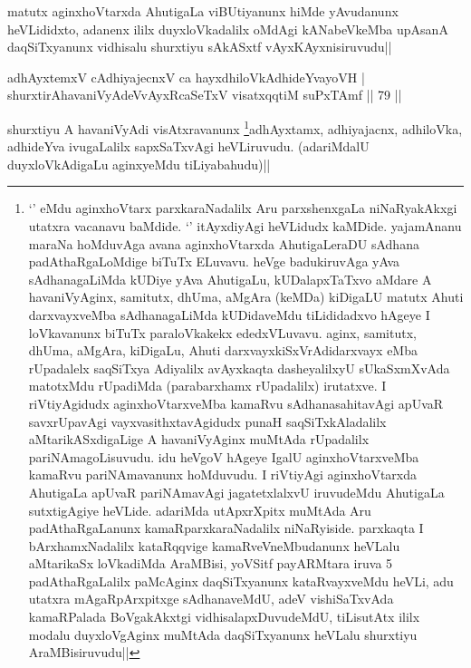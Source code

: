 \begin{artha}
matutx aginxhoVtarxda AhutigaLa viBUtiyanunx hiMde yAvudanunx 
heVLididxto, adanenx ililx duyxloVkadalilx oMdAgi kANabeVkeMba upAsanA 
daqSiTxyanunx vidhisalu shurxtiyu sAkASxtf vAyxKAyxnisiruvudu||
\end{artha}

\begin{shl}
adhAyxtemxV cAdhiyajecnxV ca hayxdhiloVkAdhideYvayoVH | \\
shurxtirAhavaniVyAdeVvAyxRcaSeTxV visatxqqtiM suPxTAmf \hfill|| 79 || 
\end{shl}

\begin{artha}
shurxtiyu A havaniVyAdi visAtxravanunx \footnote[1]{`\stext' eMdu 
aginxhoVtarx parxkaraNadalilx Aru parxshenxgaLa niNaRyakAkxgi utatxra 
vacanavu baMdide. `\stext' itAyxdiyAgi heVLidudx kaMDide. yajamAnanu 
maraNa hoMduvAga avana aginxhoVtarxda AhutigaLeraDU sAdhana 
padAthaRgaLoMdige biTuTx ELuvavu. heVge badukiruvAga yAva 
sAdhanagaLiMda kUDiye yAva AhutigaLu, kUDalapxTaTxvo aMdare A 
havaniVyAginx, samitutx, dhUma, aMgAra (keMDa) kiDigaLU matutx Ahuti 
darxvayxveMba sAdhanagaLiMda kUDidaveMdu tiLididadxvo hAgeye I 
loVkavanunx biTuTx paraloVkakekx ededxVLuvavu. aginx, samitutx, dhUma, 
aMgAra, kiDigaLu, Ahuti darxvayxkiSxVrAdidarxvayx eMba rUpadalelx 
saqSiTxya Adiyalilx avAyxkaqta dasheyalilxyU sUkaSxmXvAda matotxMdu 
rUpadiMda (parabarxhamx rUpadalilx) irutatxve. I riVtiyAgidudx 
aginxhoVtarxveMba kamaRvu sAdhanasahitavAgi apUvaR savxrUpavAgi 
vayxvasithxtavAgidudx punaH saqSiTxkAladalilx aMtarikASxdigaLige A 
havaniVyAginx muMtAda rUpadalilx pariNAmagoLisuvudu. idu heVgoV hAgeye 
IgalU aginxhoVtarxveMba kamaRvu pariNAmavanunx hoMduvudu. I riVtiyAgi 
aginxhoVtarxda AhutigaLa apUvaR pariNAmavAgi jagatetxlalxvU iruvudeMdu 
AhutigaLa sutxtigAgiye heVLide. adariMda utApxrXpitx muMtAda Aru 
padAthaRgaLanunx kamaRparxkaraNadalilx niNaRyiside. parxkaqta I 
bArxhamxNadalilx kataRqqvige kamaRveVneMbudanunx heVLalu aMtarikaSx 
loVkadiMda AraMBisi, yoVSitf payARMtara iruva 5 padAthaRgaLalilx 
paMcAginx daqSiTxyanunx kataRvayxveMdu heVLi, adu utatxra 
mAgaRpArxpitxge sAdhanaveMdU, adeV vishiSaTxvAda kamaRPalada 
BoVgakAkxtgi vidhisalapxDuvudeMdU, tiLisutAtx ililx modalu 
duyxloVgAginx muMtAda daqSiTxyanunx heVLalu shurxtiyu AraMBisiruvudu||}adhAyxtamx, 
adhiyajacnx, adhiloVka, adhideYva ivugaLalilx sapxSaTxvAgi 
heVLiruvudu. (adariMdalU duyxloVkAdigaLu aginxyeMdu tiLiyabahudu)||
\end{artha}

